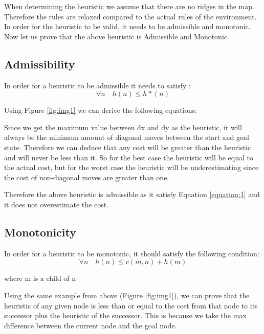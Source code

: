 \documentclass{article}
\begin{document}
	 When determining the heuristic we assume that there are no ridges in the map. Therefore the rules are relaxed compared to the actual rules of the environment. 
	In order for the heuristic to be valid, it needs to be admissible and monotonic. Now let us prove that the above heuristic is Admissible and Monotonic.
	
	\subsection{Admissibility}
	
		In order for a heuristic to be admissible it needs to satisfy :
		\begin{equation}
			\forall n \quad h(n) \le h*(n) \label{equation:1}
		\end{equation}
		
		Using Figure \ref{fig:img1} we can derive the following equations:
		
		Since we get the maximum value between dx and dy as the heuristic, it will always be the minimum amount of diagonal moves between the start and goal state. Therefore we can deduce that any cost will be greater than the heuristic and will never be less than it. So for the best case the heuristic will be equal to the actual cost, but for the worst case the heuristic will be underestimating since the cost of non-diagonal moves are greater than one.
		
		Therefore the above heuristic is admissible as it satisfy Equation \ref{equation:1} and it does not overestimate the cost.
		
	\subsection{Monotonicity}
		In order for a heuristic to be monotonic, it should satisfy the following condition:
		\begin{equation}
			\forall n \quad h(n) \le c(m,n) + h(m) \label{equation:5}
		\end{equation}
		\begin{center}
			where m is a child of n
		\end{center}
	
		Using the same example from above (Figure \ref{fig:img1}), we can prove that the heuristic of any given node is less than or equal to the cost from that node to its successor plus the heuristic of the successor. This is because we take the max difference between the current node and the goal node.
	
\end{document}
